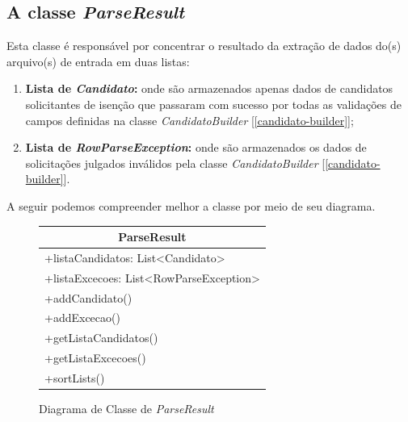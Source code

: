 \documentclass[
	12pt,			%
	openright,		%
	oneside,	
	a4paper,		%
	english,		%
	brazil			%
]{abntex2/abntex2}  %
\begin{document}
			\subsection{A classe \textit{ParseResult}} \label{parse-result}
	
				Esta classe é responsável por concentrar o resultado da extração de dados do(s) arquivo(s) de entrada em duas listas:
		
				\begin{enumerate}
						
					\item \textbf{Lista de \textit{Candidato}:} onde são armazenados apenas dados de candidatos solicitantes de isenção que passaram com sucesso por todas as validações de campos definidas na classe \textit{CandidatoBuilder} [\ref{candidato-builder}];
					\item \textbf{Lista de \textit{RowParseException}:} onde são armazenados os dados de solicitações julgados inválidos pela classe \textit{CandidatoBuilder} [\ref{candidato-builder}].
						
				\end{enumerate}
	
				A seguir podemos compreender melhor a classe por meio de seu diagrama.
	
				\begin{figure}[ht]
					\begin{center}
						
						\caption{Diagrama de Classe de \textit{ParseResult}}
						
						\begin{tabular}{|l|}
							\hline
							\multicolumn{1}{|c|}{\textbf{ParseResult}} \\ \hline
							+listaCandidatos: List\textless{}Candidato\textgreater{} \\
							+listaExcecoes: List\textless{}RowParseException\textgreater{} \\ \hline
							+addCandidato() \\
							+addExcecao() \\
							+getListaCandidatos() \\
							+getListaExcecoes() \\
							+sortLists() \\ \hline
						\end{tabular}
						
					\end{center}
				\end{figure}
	
\end{document}
